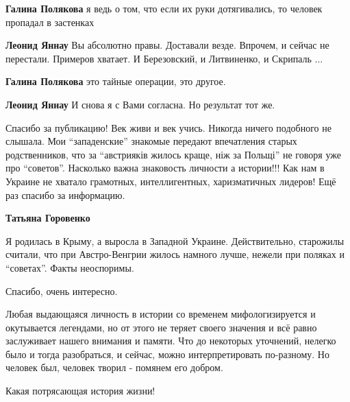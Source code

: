 \begin{itemize}
\begin{itemize}
\begin{itemize} %
\textbf{Галина Полякова} я ведь о том, что если их руки дотягивались, то человек пропадал в застенках

\textbf{Леонид Яннау} Вы абсолютно правы. Доставали везде. Впрочем, и сейчас не перестали. Примеров хватает. И Березовский, и Литвиненко, и Скрипаль ...

\textbf{Галина Полякова} это тайные операции, это другое.

\textbf{Леонид Яннау} И снова я с Вами согласна. Но результат тот же.
\end{itemize} %

\end{itemize} %


Спасибо за публикацию! Век живи и век учись. Никогда ничего подобного не
слышала. Мои \enquote{западенские} знакомые передают впечатления старых родственников,
что за \enquote{австрияків жилось краще, ніж за Польщі} не говоря уже про \enquote{советов}.
Насколько важна знаковость личности а истории!!! Как нам в Украине не хватало
грамотных, интеллигентных, харизматичных лидеров! Ещё раз спасибо за
информацию.

\begin{itemize} %
\textbf{Татьяна Горовенко} 

Я родилась в Крыму, а выросла в Западной Украине. Действительно, старожилы
считали, что при Австро-Венгрии жилось намного лучше, нежели при поляках и
\enquote{советах}. Факты неоспоримы.

\end{itemize} %

Спасибо, очень интересно.


Любая выдающаяся личность в истории со временем мифологизируется и окутывается
легендами, но от этого не теряет своего значения и всё равно заслуживает нашего
внимания и памяти. Что до некоторых уточнений, нелегко было и тогда
разобраться, и сейчас, можно интерпретировать по-разному. Но человек был,
человек творил - помянем его добром.

Какая потрясающая история жизни!



\end{itemize}
